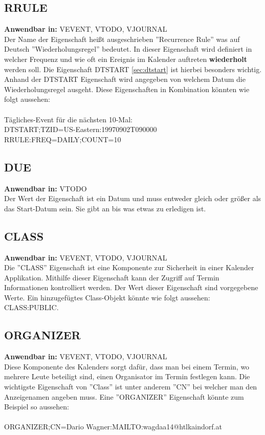 \subsection{RRULE}
\label{sec:rrule}
\textbf{Anwendbar in:} VEVENT, VTODO, VJOURNAL \\
Der Name der Eigenschaft heißt ausgeschrieben ''Recurrence Rule'' was auf Deutsch ''Wiederholungsregel'' bedeutet. In dieser Eigenschaft wird definiert in welcher Frequenz und wie oft ein Ereignis im Kalender auftreten \textbf{wiederholt} werden soll. Die Eigenschaft DTSTART \ref{sec:dtstart} ist hierbei besonders wichtig. Anhand der DTSTART Eigenschaft wird angegeben von welchem Datum die Wiederholungsregel ausgeht. Diese Eigenschaften in Kombination könnten wie folgt aussehen: \\ \\
Tägliches-Event für die nächsten 10-Mal:\\
 DTSTART;TZID=US-Eastern:19970902T090000\\
 RRULE:FREQ=DAILY;COUNT=10\\
\subsection{DUE}
\label{sec:due}
\textbf{Anwendbar in:} VTODO\\
Der Wert der Eigenschaft ist ein Datum und muss entweder gleich oder größer als das Start-Datum sein. Sie gibt an bis was etwas zu erledigen ist. 
\subsection{CLASS}
\label{sec:class}
\textbf{Anwendbar in:} VEVENT, VTODO, VJOURNAL\\
Die ''CLASS'' Eigenschaft ist eine Komponente zur Sicherheit in einer Kalender Applikation. Mithilfe dieser Eigenschaft kann der Zugriff auf Termin Informationen kontrolliert werden. Der Wert dieser Eigenschaft sind vorgegebene Werte. Ein hinzugefügtes Class-Objekt könnte wie folgt aussehen: CLASS:PUBLIC.
\subsection{ORGANIZER}
\label{sec:organizer}
\textbf{Anwendbar in:} VEVENT, VTODO, VJOURNAL\\
Diese Komponente des Kalenders sorgt dafür, dass man bei einem Termin, wo mehrere Leute beteiligt sind, einen Organisator im Termin festlegen kann. Die wichtigste Eigenschaft von ''Class'' ist unter anderem ''CN'' bei welcher man den Anzeigenamen angeben muss. Eine ''ORGANIZER'' Eigenschaft könnte zum Beispiel so aussehen: \\ \\ ORGANIZER;CN=Dario Wagner:MAILTO:wagdaa14@htlkaindorf.at\\
